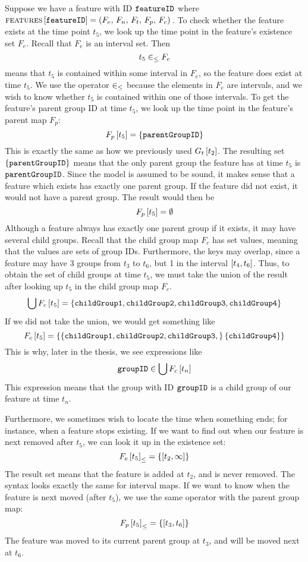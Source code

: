 Suppose we have a feature with ID $\texttt{featureID}$ where $\textsc{features} \left[ \texttt{featureID} \right] = \left(F_e,\, F_n,\, F_t,\, F_p,\, F_c\right){}$. To check whether the feature exists at the time point $t_5$, we look up the time point in the feature's existence set $F_e$. Recall that $F_e$ is an interval set. Then
\[
  t_5 \in_\leq F_e
\]
means that $t_5$ is contained within some interval in $F_e$, so the feature does exist at time $t_5$. We use the operator $\in_\leq$ because the elements in $F_e$ are intervals, and we wish to know whether $t_5$ is contained within one of those intervals. To get the feature's parent group ID at time $t_5$, we look up the time point in the feature's parent map $F_p$:
\[
  F_p \left[ t_5 \right] = \left\{\texttt{parentGroupID}\right\}
\]
This is exactly the same as how we previously used $G_t \left[ t_2 \right]$. The resulting set $\left\{\texttt{parentGroupID}\right\}$ means that the only parent group the feature has at time $t_5$ is $\texttt{parentGroupID}$. Since the model is assumed to be sound, it makes sense that a feature which exists has exactly one parent group. If the feature did not exist, it would not have a parent group. The result would then be
\[
  F_p \left[ t_5 \right] = \emptyset
\]
Although a feature always has exactly one parent group if it exists, it may have several child groups. Recall that the child group map $F_c$ has set values, meaning that the values are sets of group IDs. Furthermore, the keys may overlap, since a feature may have 3 groups from $t_3$ to $t_6$, but 1 in the interval $\interval{t_4}{t_6}$. Thus, to obtain the set of child groups at time $t_5$, we must take the union of the result after looking up $t_5$ in the child group map $F_c$.
\[
  \bigcup{F_c \left[ t_5 \right]} = \left\{\texttt{childGroup1}, \texttt{childGroup2}, \texttt{childGroup3}, \texttt{childGroup4}\right\}
\]
If we did not take the union, we would get something like
\[
  F_c \left[ t_5 \right] = \left\{\left\{\texttt{childGroup1}, \texttt{childGroup2}, \texttt{childGroup3},\right\} \left\{\texttt{childGroup4}\right\}\right\}
\]
This is why, later in the thesis, we see expressions like
\[
  \texttt{groupID} \in \bigcup{F_c \left[ t_n \right]}
\]
This expression means that the group with ID $\texttt{groupID}$ is a child group of our feature at time $t_n$.

Furthermore, we sometimes wish to locate the time when something ends; for instance, when a feature stops existing. If we want to find out when our feature is next removed after $t_5$, we can look it up in the existence set:
\[
  \containing{F_e}{t_5} = \set{\interval{t_2}{\forever}}
\]
The result set means that the feature is added at $t_2$, and is never removed. The syntax looks exactly the same for interval maps. If we want to know when the feature is next moved (after $t_5$), we use the same operator with the parent group map:
\[
  \containing{F_p}{t_5} = \set{\interval{t_3}{t_6}}
\]
The feature was moved to its current parent group at $t_3$, and will be moved next at $t_6$.

